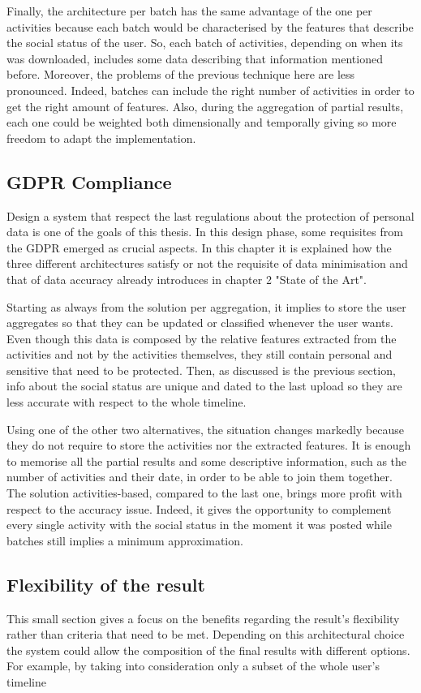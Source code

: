 Finally, the architecture per batch has the same advantage of the one per activities because each batch would be characterised by the features that describe the social status of the user.
So, each batch of activities, depending on when its was downloaded, includes some data describing that information mentioned before.
Moreover, the problems of the previous technique here are less pronounced. Indeed, batches can include the right number of activities in order to get the right amount of features.
Also, during the aggregation of partial results, each one could be weighted both dimensionally and temporally giving so more freedom to adapt the implementation.


\subsection{GDPR Compliance}
Design a system that respect the last regulations about the protection of personal data is one of the goals of this thesis.
In this design phase, some requisites from the GDPR emerged as crucial aspects. In this chapter it is explained how the three different architectures satisfy or not the requisite of data minimisation and that of data accuracy already introduces in chapter 2 "State of the Art".

Starting as always from the solution per aggregation, it implies to store the user aggregates so that they can be updated or classified whenever the user wants.
Even though this data is composed by the relative features extracted from the activities and not by the activities themselves, they still contain personal and sensitive that need to be protected.
Then, as discussed is the previous section, info about the social status are unique and dated to the last upload so they are less accurate with respect to the whole timeline.

Using one of the other two alternatives, the situation changes markedly because they do not require to store the activities nor the extracted features. It is enough to memorise all the partial results and some descriptive information, such as the number of activities and their date, in order to be able to join them together.
The solution activities-based, compared to the last one, brings more profit with respect to the accuracy issue. Indeed, it gives the opportunity to complement every single activity with the social status in the moment it was posted while batches still implies a minimum approximation.

\subsection{Flexibility of the result}
This small section gives a focus on the benefits regarding the result's flexibility rather than criteria that need to be met.
Depending on this architectural choice the system could allow the composition of the final results with different options. For example, by taking into consideration only a subset of the whole user's timeline

